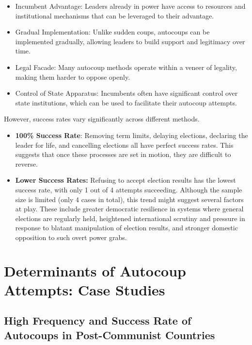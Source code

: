 \documentclass[
  12pt,
]{report}
\begin{document}
\begin{itemize}
\item
  Incumbent Advantage: Leaders already in power have access to resources
  and institutional mechanisms that can be leveraged to their advantage.
\item
  Gradual Implementation: Unlike sudden coups, autocoups can be
  implemented gradually, allowing leaders to build support and
  legitimacy over time.
\item
  Legal Facade: Many autocoup methods operate within a veneer of
  legality, making them harder to oppose openly.
\item
  Control of State Apparatus: Incumbents often have significant control
  over state institutions, which can be used to facilitate their
  autocoup attempts.
\end{itemize}

However, success rates vary significantly across different methods.

\begin{itemize}
\item
  \textbf{100\% Success Rate}: Removing term limits, delaying elections,
  declaring the leader for life, and cancelling elections all have
  perfect success rates. This suggests that once these processes are set
  in motion, they are difficult to reverse.
\item
  \textbf{Lower Success Rates:} Refusing to accept election results has
  the lowest success rate, with only 1 out of 4 attempts succeeding.
  Although the sample size is limited (only 4 cases in total), this
  trend might suggest several factors at play. These include greater
  democratic resilience in systems where general elections are regularly
  held, heightened international scrutiny and pressure in response to
  blatant manipulation of election results, and stronger domestic
  opposition to such overt power grabs.
\end{itemize}

\section{Determinants of Autocoup Attempts: Case
Studies}\label{determinants-of-autocoup-attempts-case-studies}

\subsection{High Frequency and Success Rate of Autocoups in
Post-Communist
Countries}\label{high-frequency-and-success-rate-of-autocoups-in-post-communist-countries}
\end{document}
